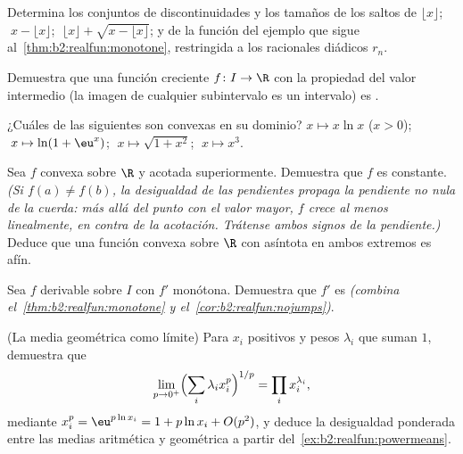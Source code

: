 \begin{exercise}[$\star$]\label{exo:b2:realfun:1}
Determina los conjuntos de discontinuidades y los tamaños de los
saltos de $\lfloor x \rfloor$; $\;x - \lfloor x\rfloor$;
$\;\lfloor x \rfloor + \sqrt{x - \lfloor x\rfloor}$; y de la función
del ejemplo que sigue al~\cref{thm:b2:realfun:monotone},
restringida a los racionales diádicos $r_n$.
\end{exercise}

\begin{exercise}[$\star$]\label{exo:b2:realfun:2}
Demuestra que una función creciente $f \colon I \to \R$ con la
propiedad del valor intermedio (la imagen de cualquier subintervalo
es un intervalo) es .
\end{exercise}

\begin{exercise}[$\star$]\label{exo:b2:realfun:3}
¿Cuáles de las siguientes son convexas en su dominio? $x \mapsto
x\ln x$ ($x > 0$); $\;x \mapsto \ln(1 + \eu^x)$; $\;x \mapsto
\sqrt{1 + x^2}$; $\;x \mapsto x^3$.
\end{exercise}

\begin{exercise}[$\star\star$]\label{exo:b2:realfun:4}
Sea $f$ convexa sobre $\R$ y acotada superiormente. Demuestra que
$f$ es constante. \emph{(Si $f(a) \neq f(b)$, la desigualdad de las
pendientes propaga la pendiente no nula de la cuerda: más allá del
punto con el valor mayor, $f$ crece al menos linealmente, en contra
de la acotación. Trátense ambos signos de la pendiente.)} Deduce que
una función convexa sobre $\R$ con asíntota en ambos extremos es
afín.
\end{exercise}

\begin{exercise}[$\star\star$]\label{exo:b2:realfun:5}
Sea $f$ derivable sobre $I$ con $f'$ monótona. Demuestra que $f'$ es
 \emph{(combina el~\cref{thm:b2:realfun:monotone} y el~\cref{cor:b2:realfun:nojumps})}.
\end{exercise}

\begin{exercise}[$\star\star$]\label{exo:b2:realfun:6}
(La media geométrica como límite) Para $x_i$ positivos y pesos
$\lambda_i$ que suman $1$, demuestra que
\[
\lim_{p \to 0^+} \Bigl(\sum_i \lambda_i x_i^p\Bigr)^{1/p}
= \prod_i x_i^{\lambda_i} ,
\]
mediante $x_i^p = \eu^{p\ln x_i} = 1 + p\ln x_i + O(p^2)$, y deduce
la desigualdad ponderada entre las medias aritmética y geométrica a
partir del~\cref{ex:b2:realfun:powermeans}.
\end{exercise}

